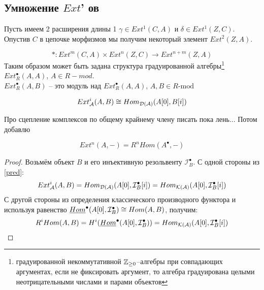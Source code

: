 \documentclass[../main.tex]{subfiles}
\begin{document}
\subsection{Умножение $Ext$' ов}
Пусть имеем 2 расширения длины 1 $\gamma \in Ext^1(C, A)$ и $\delta \in Ext^1(Z, C)$. Опустив $C$ в цепочке морфизмов мы получим некоторый элемент $Ext^2(Z, A)$.
\bee
{}
\eee
\[
* \colon Ext^m (C, A) \times Ext^n(Z, C) \rightarrow Ext^{n+m}(Z, A)
\]
Таким образом может быть задана структура градуированной алгебры\footnote{градуированной некоммутативной $\mathbb{Z}_{\ge 0}$--алгебры при совпадающих аргументах, если не фиксировать аргумент, то алгебра градуирована целыми неотрицательными числами и парами объектов
} $Ext_{R}^\bullet (A, A)$, $A\in R-mod $.\\
$Ext_{R}^\bullet(A, B)$ -- это модуль над $Ext_{R}^\bullet(A, A)$, $A, B \in R\text{-mod} $
\begin{to_claim}
\[Ext_{\mathcal{A}}^i(A, B) \cong Hom_{\mathcal{D(A)}}(A[0], B[i])\]
\bee
\eee
\end{to_claim}
{\color{green} Про сцепление комплексов по общему крайнему члену писать пока лень... Потом добавлю}
\begin{to_claim}\label{pred}
\[
Ext^n(A, -) = R^n Hom(A^\bullet, -)
\]
\end{to_claim}
\begin{proof}
Возьмём объект $B$ и его инъективную резольвенту $\mathcal{I}_B^\bullet$. С одной стороны из \ref{pred}:
\[
Ext^i_{\mathcal{A}}(A, B) = Hom_{\mathcal{D(A)}} (A[0],\mathcal{I}_B^\bullet [i]) = Hom_{\mathcal{K(A)}}(A[0],\mathcal{I}_B^\bullet [i])
\]
С другой стороны из определения классического производного функтора и используя равенство $\underline{Hom}^\bullet(A[0], \mathcal{I}_B^\bullet) \cong Hom(A, B)$, получим:
\[
R^i Hom(A, B) = H^i(\underline{Hom}^\bullet(A[0], \mathcal{I}_B^\bullet))=Hom_{\mathcal{K(A)}}(A[0], \mathcal{I}_B^\bullet [i])
\]
\end{proof}
\end{document}
